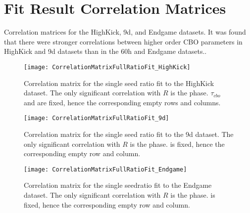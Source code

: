 
\thispagestyle{myheadings}

\graphicspath{{Body/Figures/Wa/Datasets/Endgame/SingleIteration/CaloFits/}{Body/Figures/Wa/Datasets/60h/SingleIteration/SingleFits/}{Body/Figures/Wa/Datasets/HighKick/SingleIteration/SingleFits/}{Body/Figures/Wa/Datasets/9d/SingleIteration/SingleFits/}{Body/Figures/Wa/Datasets/Endgame/SingleIteration/SingleFits/}}


\chapter{Fit Result Correlation Matrices}
\label{app:CorrelationMatrices}

Correlation matrices for the HighKick, 9d, and Endgame datasets. It was found that there were stronger correlations between higher order CBO parameters in HighKick and 9d datasets than in the 60h and Endgame datasets..

\begin{figure}[]
    \centering
    \texttt{[image: CorrelationMatrixFullRatioFit\_HighKick]}
    \caption[HighKick ratio fit correlation matrix]{Correlation matrix for the single seed ratio fit to the HighKick dataset. The only significant correlation with $R$ is the \gmtwo phase. $\tau_{cbo}$ and \K are fixed, hence the corresponding empty rows and columns.}
    \label{fig:CorrMat_HighKick}
\end{figure}

\begin{figure}[]
    \centering
    \texttt{[image: CorrelationMatrixFullRatioFit\_9d]}
    \caption[9d ratio fit correlation matrix]{Correlation matrix for the single seed ratio fit to the 9d dataset. The only significant correlation with $R$ is the \gmtwo phase. \K is fixed, hence the corresponding empty row and column.}
    \label{fig:CorrMat_9d}
\end{figure}


\begin{figure}[]
    \centering
    \texttt{[image: CorrelationMatrixFullRatioFit\_Endgame]}
    \caption[Endgame ratio fit correlation matrix]{Correlation matrix for the single seedratio fit to the Endgame dataset. The only significant correlation with $R$ is the \gmtwo phase. \K is fixed, hence the corresponding empty row and column.}
    \label{fig:CorrMat_Endgame}
\end{figure}


